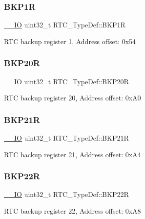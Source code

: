 \subsubsection{\texorpdfstring{BKP1R}{BKP1R}}
{\footnotesize\ttfamily \mbox{\hyperlink{core__sc300_8h_aec43007d9998a0a0e01faede4133d6be}{\+\_\+\+\_\+\+IO}} uint32\+\_\+t R\+T\+C\+\_\+\+Type\+Def\+::\+B\+K\+P1R}

R\+TC backup register 1, Address offset\+: 0x54 \mbox{\label{struct_r_t_c___type_def_a3e391ffa70a17dc5f95a841b5ec7554c}} 
\subsubsection{\texorpdfstring{BKP20R}{BKP20R}}
{\footnotesize\ttfamily \mbox{\hyperlink{core__sc300_8h_aec43007d9998a0a0e01faede4133d6be}{\+\_\+\+\_\+\+IO}} uint32\+\_\+t R\+T\+C\+\_\+\+Type\+Def\+::\+B\+K\+P20R}

R\+TC backup register 20, Address offset\+: 0x\+A0 \mbox{\label{struct_r_t_c___type_def_a170847c24f166be0939a6eaeed7eeeee}} 
\subsubsection{\texorpdfstring{BKP21R}{BKP21R}}
{\footnotesize\ttfamily \mbox{\hyperlink{core__sc300_8h_aec43007d9998a0a0e01faede4133d6be}{\+\_\+\+\_\+\+IO}} uint32\+\_\+t R\+T\+C\+\_\+\+Type\+Def\+::\+B\+K\+P21R}

R\+TC backup register 21, Address offset\+: 0x\+A4 \mbox{\label{struct_r_t_c___type_def_a679ec46535cae5149dc4d84e7c5d985c}} 
\subsubsection{\texorpdfstring{BKP22R}{BKP22R}}
{\footnotesize\ttfamily \mbox{\hyperlink{core__sc300_8h_aec43007d9998a0a0e01faede4133d6be}{\+\_\+\+\_\+\+IO}} uint32\+\_\+t R\+T\+C\+\_\+\+Type\+Def\+::\+B\+K\+P22R}

R\+TC backup register 22, Address offset\+: 0x\+A8 \mbox{\label{struct_r_t_c___type_def_a7836b793c4ecc58a27733329f26550a7}} 
